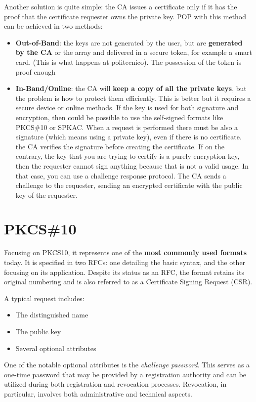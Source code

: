Another solution is quite simple: the CA issues a certificate only if
it has the proof that the certificate requester owns the private key.
POP with this method can be achieved in two methods:
\begin{itemize}
  \item \textbf{Out-of-Band}: the keys are not generated by the user,
    but are \textbf{generated by the CA} or the array and delivered in
    a secure token, for example a smart card. (This is what happens at
    politecnico). The possession of the token is proof enough
  \item \textbf{In-Band/Online}: the CA will \textbf{keep a copy of
    all the private keys}, but the problem is how to protect them
    efficiently. This is better but it requires a secure device or
    online methods. If the key is used for both signature and
    encryption, then could be possible to use the self-signed formats
    like PKCS\#10 or SPKAC.  When a request is performed there must be
    also a signature (which means using a private key), even if there
    is no certificate. the CA verifies the signature before creating
    the certificate. If on the contrary, the key that you are trying
    to certify is a purely encryption key, then the requester cannot
    sign anything because that is not a valid usage. In that case, you
    can use a challenge response protocol. The CA sends a challenge to
    the requester, sending an encrypted certificate with the public
    key of the requester. 
\end{itemize}

\section{PKCS\#10}

Focusing on PKCS10, it represents one of the \textbf{most commonly
used formats} today. It is specified in two RFCs: one detailing the
basic syntax, and the other focusing on its application. Despite its
status as an RFC, the format retains its original numbering and is
also referred to as a Certificate Signing Request (CSR).

A typical request includes:
\begin{itemize}
  \item The distinguished name
  \item The public key
  \item Several optional attributes
\end{itemize}

One of the notable optional attributes is the \textit{challenge
password}. This serves as a one-time password that may be provided by a
registration authority and can be utilized during both registration and
revocation processes. Revocation, in particular, involves both
administrative and technical aspects.

